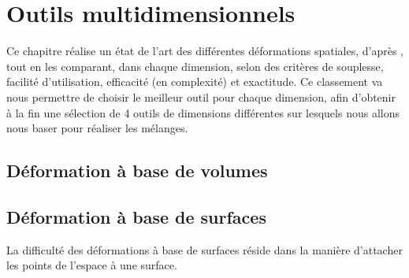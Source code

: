 
\chapter{Outils multidimensionnels}

\graphicspath{{Chapter1/Chapter1Figs/PNG/}{Chapter1/Chapter1Figs/PDF/}{Chapter1/Chapter1Figs/}}

Ce chapitre réalise un état de l'art des différentes déformations
spatiales, d'après \cite{GB08}, tout en les comparant, dans chaque dimension, selon des critères
de souplesse, facilité d'utilisation, efficacité (en complexité) et
exactitude. Ce classement va nous permettre de choisir le meilleur
outil pour chaque dimension, afin d'obtenir à la fin une sélection de
4 outils de dimensions différentes sur lesquels nous allons nous baser
pour réaliser les mélanges.

\section{Déformation à base de volumes}

\section{Déformation à base de surfaces}
La difficulté des déformations à base de surfaces réside dans la
manière d'attacher les points de l'espace à une surface.

